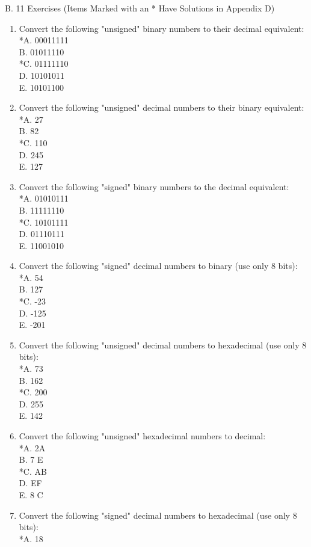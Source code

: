 \documentclass[10pt]{book}
\begin{document}
B. 11 Exercises (Items Marked with an * Have Solutions in Appendix D)
\begin{enumerate}
  \item Convert the following "unsigned" binary numbers to their decimal equivalent:\\
*A. 00011111\\
B. 01011110\\
*C. 01111110\\
D. 10101011\\
E. 10101100
  \item Convert the following "unsigned" decimal numbers to their binary equivalent:\\
*A. 27\\
B. 82\\
*C. 110\\
D. 245\\
E. 127
  \item Convert the following "signed" binary numbers to the decimal equivalent:\\
*A. 01010111\\
B. 11111110\\
*C. 10101111\\
D. 01110111\\
E. 11001010
  \item Convert the following "signed" decimal numbers to binary (use only 8 bits):\\
*A. 54\\
B. 127\\
*C. -23\\
D. -125\\
E. -201
  \item Convert the following "unsigned" decimal numbers to hexadecimal (use only 8 bits):\\
*A. 73\\
B. 162\\
*C. 200\\
D. 255\\
E. 142
  \item Convert the following "unsigned" hexadecimal numbers to decimal:\\
*A. 2A\\
B. 7 E\\
*C. AB\\
D. EF\\
E. 8 C
  \item Convert the following "signed" decimal numbers to hexadecimal (use only 8 bits):\\
*A. 18\\

\end{enumerate}
\end{document}
